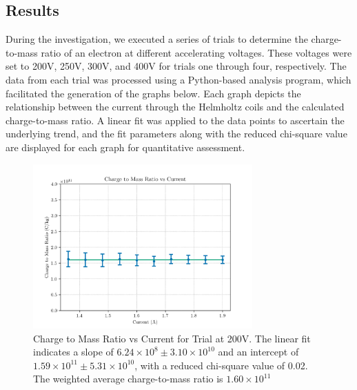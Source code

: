 \documentclass{article}
\begin{document}
\subsection{Results}
\label{subsec:data-analysis-results}

During the investigation, we executed a series of trials to determine the charge-to-mass ratio of an electron at different accelerating voltages. These voltages were set to 200V, 250V, 300V, and 400V for trials one through four, respectively. The data from each trial was processed using a Python-based analysis program, which facilitated the generation of the graphs below. Each graph depicts the relationship between the current through the Helmholtz coils and the calculated charge-to-mass ratio. A linear fit was applied to the data points to ascertain the underlying trend, and the fit parameters along with the reduced chi-square value are displayed for each graph for quantitative assessment.

\begin{figure}[H]
    \centering
    \includegraphics[width=0.75\textwidth]{trial_200.png}
    \caption{Charge to Mass Ratio vs Current for Trial at 200V. The linear fit indicates a slope of \(6.24 \times 10^{8} \pm 3.10 \times 10^{10}\) and an intercept of \(1.59 \times 10^{11} \pm 5.31 \times 10^{10}\), with a reduced chi-square value of 0.02. The weighted average charge-to-mass ratio is \(1.60 \times 10^{11}\)}
    \label{fig:trial200}
\end{figure}
\end{document}
